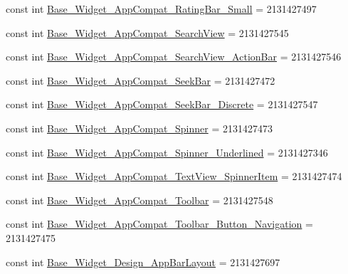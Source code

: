 \begin{DoxyCompactItemize}
\item 
const int \mbox{\hyperlink{class_f_w_p_s___app_1_1_droid_1_1_resource_1_1_style_a62c538b71c381555378b373b0e6b9a62}{Base\+\_\+\+Widget\+\_\+\+App\+Compat\+\_\+\+Rating\+Bar\+\_\+\+Small}} = 2131427497
\item 
const int \mbox{\hyperlink{class_f_w_p_s___app_1_1_droid_1_1_resource_1_1_style_a1b6f47638bc86b4fce0cdc3329c88643}{Base\+\_\+\+Widget\+\_\+\+App\+Compat\+\_\+\+Search\+View}} = 2131427545
\item 
const int \mbox{\hyperlink{class_f_w_p_s___app_1_1_droid_1_1_resource_1_1_style_a6ceb8d7cb5cb99be649b10fb1dc6d169}{Base\+\_\+\+Widget\+\_\+\+App\+Compat\+\_\+\+Search\+View\+\_\+\+Action\+Bar}} = 2131427546
\item 
const int \mbox{\hyperlink{class_f_w_p_s___app_1_1_droid_1_1_resource_1_1_style_a7541774ee465d2ca0ffcf948523da29b}{Base\+\_\+\+Widget\+\_\+\+App\+Compat\+\_\+\+Seek\+Bar}} = 2131427472
\item 
const int \mbox{\hyperlink{class_f_w_p_s___app_1_1_droid_1_1_resource_1_1_style_aa244b023ec77322a1ee36c77453e5d0f}{Base\+\_\+\+Widget\+\_\+\+App\+Compat\+\_\+\+Seek\+Bar\+\_\+\+Discrete}} = 2131427547
\item 
const int \mbox{\hyperlink{class_f_w_p_s___app_1_1_droid_1_1_resource_1_1_style_aa8f2adfa4345c77ed1f0fb949cd49e49}{Base\+\_\+\+Widget\+\_\+\+App\+Compat\+\_\+\+Spinner}} = 2131427473
\item 
const int \mbox{\hyperlink{class_f_w_p_s___app_1_1_droid_1_1_resource_1_1_style_a83a95f79501dbefaf77eb140d8898998}{Base\+\_\+\+Widget\+\_\+\+App\+Compat\+\_\+\+Spinner\+\_\+\+Underlined}} = 2131427346
\item 
const int \mbox{\hyperlink{class_f_w_p_s___app_1_1_droid_1_1_resource_1_1_style_a49bf8d6bbfd767d4bfefee1f4ec23df2}{Base\+\_\+\+Widget\+\_\+\+App\+Compat\+\_\+\+Text\+View\+\_\+\+Spinner\+Item}} = 2131427474
\item 
const int \mbox{\hyperlink{class_f_w_p_s___app_1_1_droid_1_1_resource_1_1_style_abd3c7f35b4d007fd2b23591e15f5aca7}{Base\+\_\+\+Widget\+\_\+\+App\+Compat\+\_\+\+Toolbar}} = 2131427548
\item 
const int \mbox{\hyperlink{class_f_w_p_s___app_1_1_droid_1_1_resource_1_1_style_aeed2c4108c6f917aff1fc133834426bb}{Base\+\_\+\+Widget\+\_\+\+App\+Compat\+\_\+\+Toolbar\+\_\+\+Button\+\_\+\+Navigation}} = 2131427475
\item 
const int \mbox{\hyperlink{class_f_w_p_s___app_1_1_droid_1_1_resource_1_1_style_ab8c44be98c5522b4b2e0eabb6f8a9d85}{Base\+\_\+\+Widget\+\_\+\+Design\+\_\+\+App\+Bar\+Layout}} = 2131427697

\end{DoxyCompactItemize}
